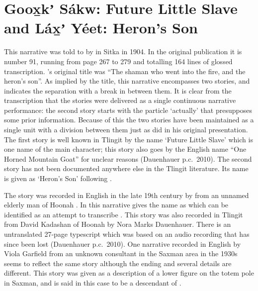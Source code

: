 
\resetexcnt
\chapter{Goox̱kʼ Sákw: Future Little Slave and Láx̱ʼ Yéet: Heron’s Son}\label{ch:91-future-little-slave}

This narrative was told to \citeauthor{swanton:1909} by  in Sitka in 1904.
In the original publication it is number 91, running from page 267 to 279 and totalling 164 lines of glossed transcription.
\citeauthor{swanton:1909}’s original title was “The shaman who went into the fire, and the heron’s son”.
As implied by the title, this narrative encompasses two stories, and \citeauthor{swanton:1909} indicates the separation with a break in between them.
It is clear from the transcription that the stories were delivered as a single continuous narrative performance: the second story starts with the particle  ‘actually’ that presupposes some prior information.
Because of this the two stories have been maintained as a single unit with a division between them just as \citeauthor{swanton:1909} did in his original presentation.
The first story is well known in Tlingit by the name  ‘Future Little Slave’ which is one name of the main character; this story also goes by the English name “One Horned Mountain Goat” for unclear reasons (Dauenhauer p.c.\ 2010).
The second story has not been documented anywhere else in the Tlingit literature.
Its name is given as  ‘Heron’s Son’ following \citeauthor{swanton:1909}.

The  story was recorded in English in the late 19th century by \citeauthor{emmons:1907} from an unnamed elderly man of Hoonah \parencite[333–334]{emmons:1907}.
In this narrative \citeauthor{emmons:1907} gives the name as  which can be identified as an attempt to transcribe .
This story was also recorded in Tlingit from  David Ka\-da\-shan of Hoonah by  Nora Marks Dauenhauer.
There is an untranslated 27-page typescript \parencite{dauenhauer:1973} which was based on an audio recording that has since been lost (Dauenhauer p.c.\ 2010).
One narrative recorded in English by Viola Garfield from an unknown consultant in the Saxman area in the 1930s seems to reflect the same story although the ending and several details are different.
This story was given as a description of a lower figure on the  totem pole in Saxman, and  is said in this case to be a descendant of  \parencite[33–35]{garfield-forrest:1948}.

